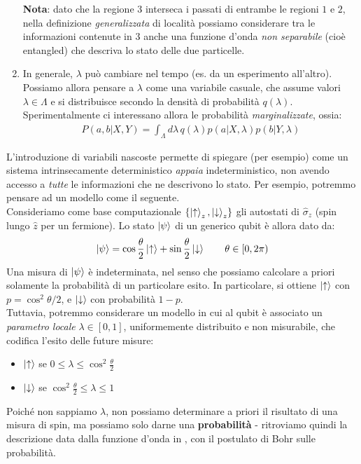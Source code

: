 \documentclass[../../InformazioneQuantistica.tex]{subfiles}
\begin{document}
\begin{enumerate}
\begin{expl}
\textbf{Nota}: dato che la regione $3$ interseca i passati di entrambe le regioni $1$ e $2$, nella definizione \textit{generalizzata} di località possiamo considerare tra le informazioni contenute in $3$ anche una funzione d'onda \textit{non separabile} (cioè entangled) che descriva lo stato delle due particelle. 
\end{expl}

\item In generale, $\lambda$ può cambiare nel tempo (es. da un esperimento all'altro). Possiamo allora pensare a $\lambda$ come una variabile casuale, che assume valori $\lambda \in \Lambda$ e si distribuisce secondo la densità di probabilità $q(\lambda)$. Sperimentalmente ci interessano allora le probabilità \textit{marginalizzate}, ossia:
\begin{align}
P(a,b|X,Y)=\int_\Lambda d\lambda\,q(\lambda) p(a|X,\lambda) p(b|Y,\lambda)
\label{eqn:prob-cond-final}
\end{align}
\end{enumerate}

L'introduzione di variabili nascoste permette di spiegare (per esempio) come un sistema intrinsecamente deterministico \textit{appaia} indeterministico, non avendo accesso a \textit{tutte} le informazioni che ne descrivono lo stato. Per esempio, potremmo pensare ad un modello come il seguente.\\
Consideriamo come base computazionale $\{\Ket{\uparrow}_z, \Ket{\downarrow}_z\}$ gli autostati di $\hat{\sigma}_z$ (spin lungo $\hat{z}$ per un fermione). Lo stato $\Ket{\psi}$ di un generico qubit è allora dato da:
\begin{align*}
\Ket{\psi} = \cos\frac{\theta}{2}\Ket{\uparrow} + \sin\frac{\theta}{2} \Ket{\downarrow} \qquad \theta \in [0,2\pi)
\end{align*}
Una misura di $\Ket{\psi}$ è indeterminata, nel senso che possiamo calcolare a priori solamente la probabilità di un particolare esito. In particolare, si ottiene $\Ket{\uparrow}$ con $p=\cos^2 \theta/2$, e $\Ket{\downarrow}$ con probabilità $1-p$.\\
Tuttavia, potremmo considerare un modello in cui al qubit è associato un \textit{parametro locale} $\lambda \in[0,1]$, uniformemente distribuito e non misurabile, che codifica l'esito delle future misure: 
\begin{itemize}
\item $\Ket{\uparrow}$ se $0 \leq \lambda \leq \cos^2 \frac{\theta}{2}$
\item $\Ket{\downarrow}$ se $\cos^2 \frac{\theta}{2} \leq \lambda \leq 1$
\end{itemize}
Poiché non sappiamo $\lambda$, non possiamo determinare a priori il risultato di una misura di spin, ma possiamo solo darne una \textbf{probabilità} - ritroviamo quindi la descrizione data dalla funzione d'onda in \MQ, con il postulato di Bohr sulle probabilità.\\
\end{document}
